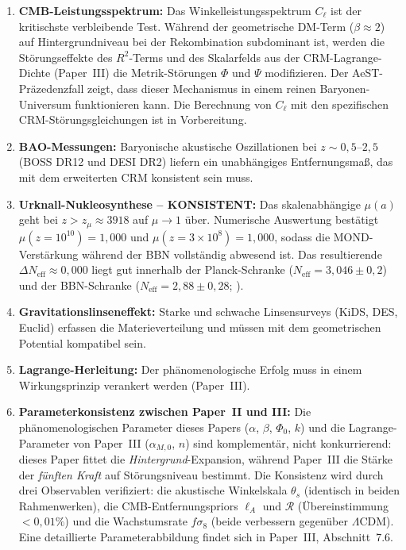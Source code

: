 \documentclass[aps,prd,twocolumn,superscriptaddress,nofootinbib]{revtex4-2}
\begin{document}
\begin{enumerate}
\item \textbf{CMB-Leistungsspektrum:} Das Winkelleistungsspektrum $C_\ell$ ist der kritischste verbleibende Test. W\"ahrend der geometrische DM-Term ($\beta \approx 2$) auf Hintergrundniveau bei der Rekombination subdominant ist, werden die St\"orungseffekte des $R^2$-Terms und des Skalarfelds aus der CRM-Lagrange-Dichte (Paper~III) die Metrik-St\"orungen $\Phi$ und $\Psi$ modifizieren. Der AeST-Pr\"azedenzfall \cite{Skordis2021} zeigt, dass dieser Mechanismus in einem reinen Baryonen-Universum funktionieren kann. Die Berechnung von $C_\ell$ mit den spezifischen CRM-St\"orungsgleichungen ist in Vorbereitung.

\item \textbf{BAO-Messungen:} Baryonische akustische Oszillationen bei $z \sim 0{,}5$--$2{,}5$ (BOSS DR12 \cite{Alam2017} und DESI DR2) liefern ein unabh\"angiges Entfernungsmaß, das mit dem erweiterten CRM konsistent sein muss.

\item \textbf{Urknall-Nukleosynthese -- KONSISTENT:} Das skalenabh\"angige $\mu(a)$ geht bei $z > z_\mu \approx 3918$ auf $\mu \to 1$ \"uber. Numerische Auswertung best\"atigt $\mu(z = 10^{10}) = 1{,}000$ und $\mu(z = 3 \times 10^8) = 1{,}000$, sodass die MOND-Verst\"arkung w\"ahrend der BBN vollst\"andig abwesend ist. Das resultierende $\Delta N_{\mathrm{eff}} \approx 0{,}000$ liegt gut innerhalb der Planck-Schranke ($N_{\mathrm{eff}} = 3{,}046 \pm 0{,}2$) und der BBN-Schranke ($N_{\mathrm{eff}} = 2{,}88 \pm 0{,}28$; \cite{Pitrou2018}).

\item \textbf{Gravitationslinseneffekt:} Starke und schwache Linsensurveys (KiDS, DES, Euclid) erfassen die Materieverteilung und m\"ussen mit dem geometrischen Potential kompatibel sein.

\item \textbf{Lagrange-Herleitung:} Der ph\"anomenologische Erfolg muss in einem Wirkungsprinzip verankert werden (Paper~III).

\item \textbf{Parameterkonsistenz zwischen Paper~II und III:} Die ph\"anomenologischen Parameter dieses Papers ($\alpha$, $\beta$, $\Phi_0$, $k$) und die Lagrange-Parameter von Paper~III ($\alpha_{M,0}$, $n$) sind komplement\"ar, nicht konkurrierend: dieses Paper fittet die \textit{Hintergrund}-Expansion, w\"ahrend Paper~III die St\"arke der \textit{f\"unften Kraft} auf St\"orungsniveau bestimmt. Die Konsistenz wird durch drei Observablen verifiziert: die akustische Winkelskala $\theta_s$ (identisch in beiden Rahmenwerken), die CMB-Entfernungspriors $\ell_A$ und $\mathcal{R}$ (\"Ubereinstimmung $<0{,}01\%$) und die Wachstumsrate $f\sigma_8$ (beide verbessern gegen\"uber $\Lambda$CDM). Eine detaillierte Parameterabbildung findet sich in Paper~III, Abschnitt~7.6.
\end{enumerate}
\end{document}
